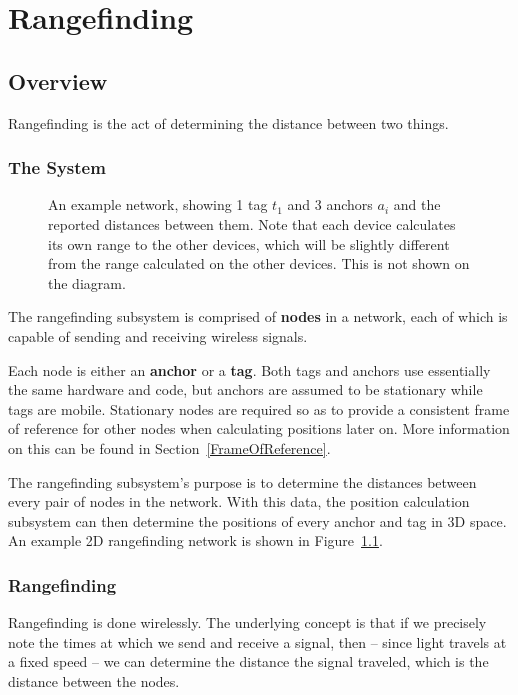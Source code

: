 
\chapter{Rangefinding} %

\label{Rangefinding}


\section{Overview}
 Rangefinding is the act of determining the distance between two things.
 
\subsection{The System}

\begin{figure}
	\centering
	
	\decoRule
	\caption{An example network, showing 1 tag $t_1$ and 3 anchors $a_i$ and the reported distances between them. Note that each device calculates its own range to the other devices, which will be slightly different from the range calculated on the other devices. This is not shown on the diagram.}
	\label{fig:ExampleNetwork}
\end{figure}

The rangefinding subsystem is comprised of \textbf{nodes} in a network, each of which is capable of sending and receiving wireless signals.

Each node is either an \textbf{anchor} or a \textbf{tag}. Both tags and anchors use essentially the same hardware and code, but anchors are assumed to be stationary while tags are mobile. Stationary nodes are required so as to provide a consistent frame of reference for other nodes when calculating positions later on. More information on this can be found in Section~\ref{FrameOfReference}.

The rangefinding subsystem's purpose is to determine the distances between every pair of nodes in the network. With this data, the position calculation subsystem can then determine the positions of every anchor and tag in 3D space. An example 2D rangefinding network is shown in Figure~\ref{fig:ExampleNetwork}.

\subsection{Rangefinding}
Rangefinding is done wirelessly. The underlying concept is that if we precisely note the times at which we send and receive a signal, then -- since light travels at a fixed speed -- we can determine the distance the signal traveled, which is the distance between the nodes. 

